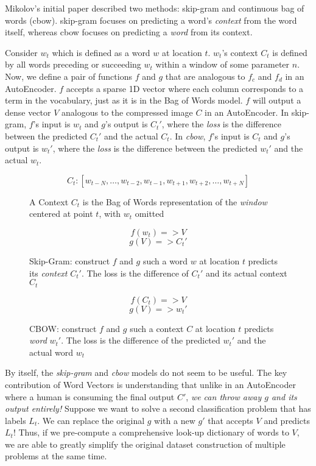 \par{
Mikolov's initial paper described two methods: \textsf{skip-gram} and \textsf{continuous bag of words (cbow)}. \textsf{skip-gram} focuses on predicting a word's \textit{context} from the word itself, whereas \textsf{cbow} focuses on predicting a \textit{word} from its context. 
}

\par{
Consider $w_t$ which is defined as a word $w$ at location $t$. $w_t$'s context $C_t$ is defined by all words preceding or succeeding $w_t$ within a window of some parameter $n$. Now, we define a pair of functions $f$ and $g$ that are analogous to $f_c$ and $f_d$ in an AutoEncoder. $f$ accepts a sparse 1D vector where each column corresponds to a term in the vocabulary, just as it is in the Bag of Words model. $f$ will output a dense vector $V$ analogous to the compressed image $C$ in an AutoEncoder. In \textsf{skip-gram}, $f$'s input is $w_t$ and $g$'s output is $C_t'$, where the \textit{loss} is the difference between the predicted $C_t'$ and the actual $C_t$. In \textit{cbow}, $f$'s input is $C_t$ and $g$'s output is $w_t'$, where the \textit{loss} is the difference between the predicted $w_t'$ and the actual $w_t$. 
}


\begin{figure}[H]
\[ C_t: [w_{t-N}, \ldots, w_{t-2}, w_{t-1}, w_{t+1}, w_{t+2}, \ldots, w_{t+N}] \]
\caption{A Context $C_t$ is the Bag of Words representation of the \textit{window} centered at point $t$, with $w_t$ omitted}
\end{figure}


\begin{figure}[H]
\[ f(w_t) => V \]
\[ g(V) => C_t' \]
\caption{Skip-Gram: construct $f$ and $g$ such a word $w$ at location $t$ predicts its \textit{context} $C_t'$. The loss is the difference of $C_t'$ and its actual context $C_t$}
\end{figure}

\begin{figure}[H]
\[ f(C_t) => V \]
\[ g(V) => w_t' \]
\caption{CBOW: construct $f$ and $g$ such a context $C$ at location $t$ predicts \textit{word} $w_t'$. The loss is the difference of the predicted $w_t'$ and the actual word $w_t$}
\end{figure}

\par{
By itself, the \textit{skip-gram} and \textit{cbow} models do not seem to be useful. The key contribution of Word Vectors is understanding that unlike in an AutoEncoder where a human is consuming the final output $C'$, \textit{we can throw away $g$ and its output entirely!} Suppose we want to solve a second classification problem that has labels $L_t$. We can replace the original $g$ with a new $g'$ that accepts $V$ and predicts $L_t$! Thus, if we pre-compute a comprehensive look-up dictionary of words to $V$, we are able to greatly simplify the original dataset construction of multiple problems at the same time. 
}


